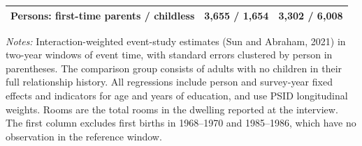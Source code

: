 \begin{table}[p]
\begin{tabular}{@{}l c c@{}}
Persons: first-time parents / childless & 3,655 / 1,654 & 3,302 / 6,008 \\
\bottomrule
\end{tabular}
\par\smallskip
\begin{minipage}{0.97\linewidth}
\footnotesize\textit{Notes:} Interaction-weighted event-study estimates
(Sun and Abraham, 2021) in two-year windows of event time, with standard errors
clustered by person in parentheses. The comparison group consists of adults
with no children in their full relationship history. All regressions include
person and survey-year fixed effects and indicators for age and years of
education, and use PSID longitudinal weights. Rooms are the total rooms in the
dwelling reported at the interview. The first column excludes first births in
1968--1970 and 1985--1986, which have no observation in the reference window.
\end{minipage}
\end{table}

